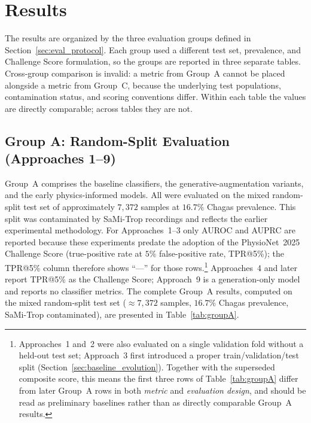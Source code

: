
\section{Results}\label{sec:results_all}
\label{chap:results}

The results are organized by the three evaluation groups defined
in Section~\ref{sec:eval_protocol}. Each group used a different
test set, prevalence, and Challenge Score formulation, so the groups
are reported in three separate tables. Cross-group comparison is invalid: a
metric from Group~A cannot be placed alongside a metric from Group~C, because
the underlying test populations, contamination status, and scoring conventions
differ. Within each table the values are directly comparable; across tables they
are not.

\subsection{Group A: Random-Split Evaluation (Approaches 1--9)}\label{sec:results_groupA}

Group~A comprises the baseline classifiers, the generative-augmentation
variants, and the early physics-informed models. All were evaluated on the
mixed random-split test set of approximately $7{,}372$ samples at $16.7\%$
Chagas prevalence. This split was contaminated by SaMi-Trop recordings and
reflects the earlier experimental methodology. For Approaches~1--3 only AUROC
and AUPRC are reported because these experiments predate the adoption of the
PhysioNet~2025 Challenge Score (true-positive rate at $5\%$ false-positive rate,
TPR@5\%); the TPR@5\% column therefore shows ``---'' for those
rows.\footnote{Approaches~1 and~2 were also evaluated on a single
validation fold without a held-out test set; Approach~3 first introduced a
proper train/validation/test split (Section~\ref{sec:baseline_evolution}).
Together with the superseded composite score, this means the first three
rows of Table~\ref{tab:groupA} differ from later Group~A rows in both
\emph{metric} and \emph{evaluation design}, and should be read as
preliminary baselines rather than as directly comparable Group~A results.}
Approaches~4 and later report TPR@5\% as the Challenge Score; Approach~9 is a
generation-only model and reports no classifier metrics. The complete
Group~A results, computed on the mixed random-split test set ($\approx 7{,}372$
samples, $16.7\%$ Chagas prevalence, SaMi-Trop contaminated), are presented in
Table~\ref{tab:groupA}.

